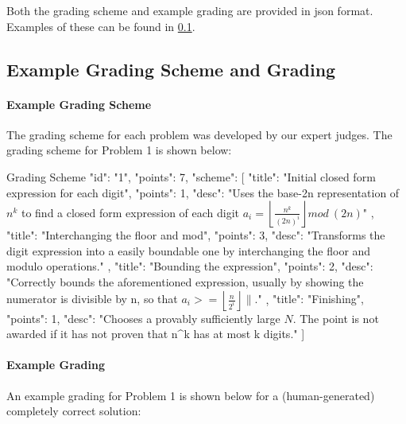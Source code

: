 Both the grading scheme and example grading are provided in json format. Examples of these can be found in \cref{app:exp_grading}.

\subsection{Example Grading Scheme and Grading}
\label{app:exp_grading}

\paragraph{Example Grading Scheme} The grading scheme for each problem was developed by our expert judges. The grading scheme for Problem 1 is shown below:

\begin{prompt}{Grading Scheme}
    {
        "id": "1",
        "points": 7,
        "scheme": [
            {
                "title": "Initial closed form expression for each digit",
                "points": 1,
                "desc": "Uses the base-2n representation of $n^k$ to find a closed form expression of each digit $a_i=\left\lfloor \frac{n^k}{(2n)^i}\right\rfloor mod\ (2n)$"
            },
            {
                "title": "Interchanging the floor and mod",
                "points": 3,
                "desc": "Transforms the digit expression into a easily boundable one by interchanging the floor and modulo operations."
            },
            {
                "title": "Bounding the expression",
                "points": 2,
                "desc": "Correctly bounds the aforementioned expression, usually by showing the numerator is divisible by n, so that $a_i>=\left\lfloor \frac{n}{2^i}\right\rfloor\|.$"
            },
            {
                "title": "Finishing",
                "points": 1,
                "desc": "Chooses a provably sufficiently large $N$. The point is not awarded if it has not proven that n^k has at most k digits."
            }
        ]
    }
\end{prompt}

\paragraph{Example Grading} An example grading for Problem 1 is shown below for a (human-generated) completely correct solution:

